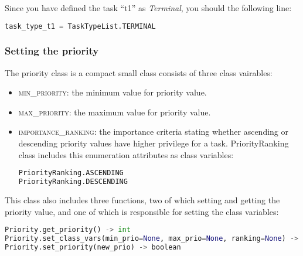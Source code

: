 \documentclass[]{scrartcl}
\begin{document}
                
Since you have defined the task ``t1'' as \emph{Terminal}, you should the following line:

\begin{lstlisting}[language=Python, frame=single, label={lst:TaskTypeInstt1}, caption={Terminal task type definition.}]
task_type_t1 = TaskTypeList.TERMINAL
\end{lstlisting}
        
        
\subsubsection{Setting the priority}
The priority class is a compact small class consists of three class vairables:
\begin{itemize}
    \item \textsc{min\_priority}: the minimum value for priority value.
    \item \textsc{max\_priority}: the maximum value for priority value.
    \item \textsc{importance\_ranking}: the importance criteria stating whether ascending or descending priority values have higher privilege for a task. \textsf{PriorityRanking} class includes this enumeration attributes
    as class variables:
    
\begin{lstlisting}[language=Python, frame=single, label={lst:t1PriorityRanking}, caption={The \textsf{PriorityRanking} enumeration.}]
PriorityRanking.ASCENDING
PriorityRanking.DESCENDING
\end{lstlisting}
        
\end{itemize}
        
This class also includes three functions, two of which setting and getting the priority value, and one of which is responsible for setting the class variables:

\begin{lstlisting}[language=Python, frame=single, label={lst:t1memberFunctionsPriority}, caption={The member functions for \textsf{Priority} module.}]
Priority.get_priority() -> int
Priority.set_class_vars(min_prio=None, max_prio=None, ranking=None) -> None (class method)
Priority.set_priority(new_prio) -> boolean
\end{lstlisting}
        
        
\end{document}
